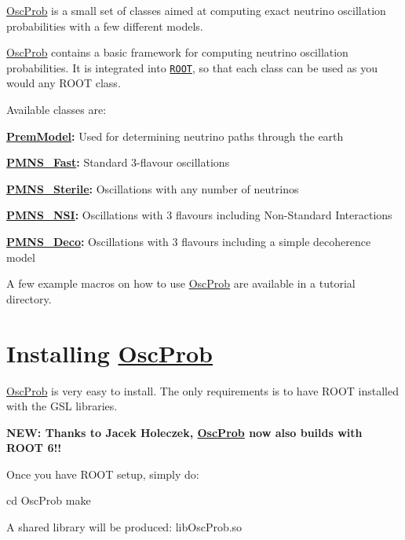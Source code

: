 \hyperlink{namespaceOscProb}{Osc\+Prob} is a small set of classes aimed at computing exact neutrino oscillation probabilities with a few different models.

\hyperlink{namespaceOscProb}{Osc\+Prob} contains a basic framework for computing neutrino oscillation probabilities. It is integrated into \href{https://root.cern.ch/}{\tt R\+O\+OT}, so that each class can be used as you would any R\+O\+OT class.

Available classes are\+:
\begin{DoxyItemize}
\item {\bfseries \hyperlink{classOscProb_1_1PremModel}{Prem\+Model}\+:} Used for determining neutrino paths through the earth
\item {\bfseries \hyperlink{classOscProb_1_1PMNS__Fast}{P\+M\+N\+S\+\_\+\+Fast}\+:} Standard 3-\/flavour oscillations
\item {\bfseries \hyperlink{classOscProb_1_1PMNS__Sterile}{P\+M\+N\+S\+\_\+\+Sterile}\+:} Oscillations with any number of neutrinos
\item {\bfseries \hyperlink{classOscProb_1_1PMNS__NSI}{P\+M\+N\+S\+\_\+\+N\+SI}\+:} Oscillations with 3 flavours including Non-\/\+Standard Interactions
\item {\bfseries \hyperlink{classOscProb_1_1PMNS__Deco}{P\+M\+N\+S\+\_\+\+Deco}\+:} Oscillations with 3 flavours including a simple decoherence model
\end{DoxyItemize}

A few example macros on how to use \hyperlink{namespaceOscProb}{Osc\+Prob} are available in a tutorial directory.

\section*{Installing \hyperlink{namespaceOscProb}{Osc\+Prob}}

\hyperlink{namespaceOscProb}{Osc\+Prob} is very easy to install. The only requirements is to have R\+O\+OT installed with the G\+SL libraries.

{\bfseries N\+EW\+: Thanks to Jacek Holeczek, \hyperlink{namespaceOscProb}{Osc\+Prob} now also builds with R\+O\+OT 6!!}

Once you have R\+O\+OT setup, simply do\+: 
\begin{DoxyCode}
cd OscProb
make
\end{DoxyCode}


A shared library will be produced\+: {\ttfamily lib\+Osc\+Prob.\+so}

